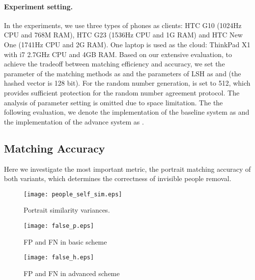 \paragraph{Experiment setting.}
In the experiments,
 we use three types of phones as clients: HTC G10 (1024Hz CPU and 768M RAM),
 HTC G23 (1536Hz CPU and 1G RAM) and HTC New One (1741Hz CPU and 2G RAM).
One laptop is used as the cloud: ThinkPad X1 with i7 2.7GHz CPU and 4GB
RAM.
Based on our extensive evaluation, to achieve the tradeoff between matching efficiency and accuracy,
 we set the parameter of the matching methods as  and the parameters of LSH as  and  (the hashed vector is 128 bit).
For the random number generation,  is set to 512, which provides sufficient protection for the random number agreement protocol.
The analysis of parameter setting is omitted due to space limitation.
The the following evaluation,
 we denote the implementation of the baseline system as \basic
 and the implementation of the advance system as \advanced.






\vspace{-0.05in}
\subsection{Matching Accuracy}
\vspace{-0.05in}
Here we investigate the most important metric,
the portrait matching accuracy of both variants, which determines the correctness of invisible people removal.


\begin{figure*}[ht]
\begin{minipage}[t]{0.28\linewidth}
\centering
\texttt{[image: people\_self\_sim.eps]}
\caption{Portrait similarity variances.}
\label{fig:self-sim}
\end{minipage}
\vspace{-0.1in}
\hfill
\begin{minipage}[t]{0.28\linewidth}
\centering
\texttt{[image: false\_p.eps]}
\caption{FP and FN  in basic scheme}
\label{fig:false-basic}
\end{minipage}
\vspace{-0.1in}
\hfill
\begin{minipage}[t]{0.28\linewidth}
\centering
\texttt{[image: false\_h.eps]}
\caption{FP and FN in advanced scheme}
\label{fig:false-advance}
\end{minipage}
\vspace{-0.1in}
\end{figure*}




